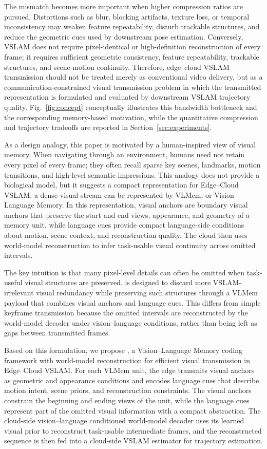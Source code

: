 The mismatch becomes more important when higher compression ratios are pursued. Distortions such as blur, blocking artifacts, texture loss, or temporal inconsistency may weaken feature repeatability, disturb trackable structures, and reduce the geometric cues used by downstream pose estimation. Conversely, VSLAM does not require pixel-identical or high-definition reconstruction of every frame; it requires sufficient geometric consistency, feature repeatability, trackable structures, and scene-motion continuity. Therefore, edge--cloud VSLAM transmission should not be treated merely as conventional video delivery, but as a communication-constrained visual transmission problem in which the transmitted representation is formulated and evaluated by downstream VSLAM trajectory quality. Fig.~\ref{fig:concept} conceptually illustrates this bandwidth bottleneck and the corresponding memory-based motivation, while the quantitative compression and trajectory tradeoffs are reported in Section~\ref{sec:experiments}.

As a design analogy, this paper is motivated by a human-inspired view of visual memory. When navigating through an environment, humans need not retain every pixel of every frame; they often recall sparse key scenes, landmarks, motion transitions, and high-level semantic impressions. This analogy does not provide a biological model, but it suggests a compact representation for Edge--Cloud VSLAM: a dense visual stream can be represented by VLMem, or Vision--Language Memory. In this representation, visual anchors are boundary visual anchors that preserve the start and end views, appearance, and geometry of a memory unit, while language cues provide compact language-side conditions about motion, scene context, and reconstruction quality. The cloud then uses world-model reconstruction to infer task-usable visual continuity across omitted intervals.

The key intuition is that many pixel-level details can often be omitted when task-useful visual structures are preserved. \VLMemCodec{} is designed to discard more VSLAM-irrelevant visual redundancy while preserving such structures through a VLMem payload that combines visual anchors and language cues. This differs from simple keyframe transmission because the omitted intervals are reconstructed by the world-model decoder under vision--language conditions, rather than being left as gaps between transmitted frames.

Based on this formulation, we propose \emph{\VLMemCodec}, a Vision--Language Memory coding framework with world-model reconstruction for efficient visual transmission in Edge--Cloud VSLAM. For each VLMem unit, the edge transmits visual anchors as geometric and appearance conditions and encodes language cues that describe motion intent, scene priors, and reconstruction constraints. The visual anchors constrain the beginning and ending views of the unit, while the language cues represent part of the omitted visual information with a compact abstraction. The cloud-side vision--language conditioned world-model decoder uses its learned visual prior to reconstruct task-usable intermediate frames, and the reconstructed sequence is then fed into a cloud-side VSLAM estimator for trajectory estimation.

